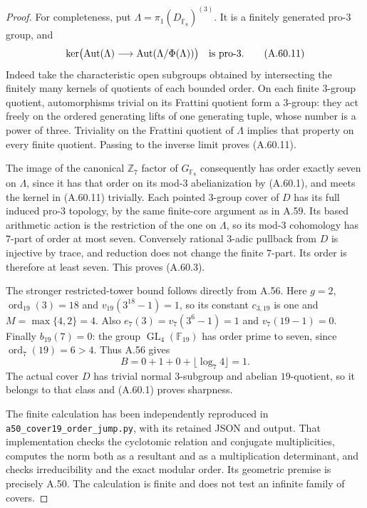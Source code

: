 \begin{proof}
For completeness, put
$\Lambda=\pi_1(D_{\overline{\mathbb F}_8})^{(3)}$.
It is a finitely generated pro-$3$ group, and
\[
 \ker\bigl(\operatorname{Aut}(\Lambda)\longrightarrow
              \operatorname{Aut}(\Lambda/\Phi(\Lambda))\bigr)
                        \quad\hbox{is pro-}3.                \tag{A.60.11}
\]
Indeed take the characteristic open subgroups obtained
by intersecting the finitely many kernels of quotients
of each bounded order.  On each finite $3$-group quotient,
automorphisms trivial on its Frattini quotient form a
$3$-group: they act freely on the ordered generating
lifts of one generating tuple, whose number is a power
of three.  Triviality on the Frattini quotient of
$\Lambda$ implies that property on every finite quotient.
Passing to the inverse limit proves (A.60.11).

The image of the canonical $\mathbb Z_7$ factor of
$G_{\mathbb F _8}$ consequently has order exactly seven
on $\Lambda$, since it has that order on its mod-$3$
abelianization by (A.60.1), and meets the kernel in
(A.60.11) trivially.
Each pointed $3$-group cover of $D$ has its full induced
pro-$3$ topology, by the same finite-core argument as
in A.59.  Its based arithmetic action is the restriction
of the one on $\Lambda$, so its mod-$3$ cohomology has
$7$-part of order at most seven.
Conversely rational $3$-adic pullback from $D$ is injective
by trace, and reduction does not change the finite
$7$-part.  Its order is therefore at least seven.
This proves (A.60.3).

The stronger restricted-tower bound follows directly
from A.56.  Here $g=2$,
$\operatorname{ord}_{19}(3)=18$ and
$v_{19}(3^{18}-1)=1$, so its constant $c_{3,19}$ is one
and $M=\max\{4,2\}=4$.
Also $e_7(3)=v_7(3^6-1)=1$ and $v_7(19-1)=0$.
Finally $b_{19}(7)=0$: the group
$\operatorname{GL}_4(\mathbb F _{19})$ has order prime
to seven, since $\operatorname{ord}_7(19)=6>4$.
Thus A.56 gives
\[
                    B=0+1+0+\lfloor\log_7 4\rfloor=1.       \tag{A.60.12}
\]
The actual cover $D$ has trivial normal $3$-subgroup
and abelian $19$-quotient, so it belongs to that class
and (A.60.1) proves sharpness.

The finite calculation has been independently reproduced
in \texttt{a50\_cover19\_order\_jump.py},
with its retained JSON and output.  That implementation
checks the cyclotomic relation and conjugate multiplicities,
computes the norm both as a resultant and as a multiplication
determinant, and checks irreducibility and the exact modular
order.  Its geometric premise is precisely A.50.
The calculation is finite and does not test an infinite
family of covers.
\end{proof}

